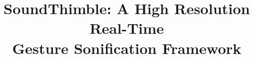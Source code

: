\documentclass{nime-alternate}
\begin{document}
%

\title{SoundThimble: A High Resolution Real-Time\\Gesture Sonification Framework}

%
%
%
%
%
\end{document}
